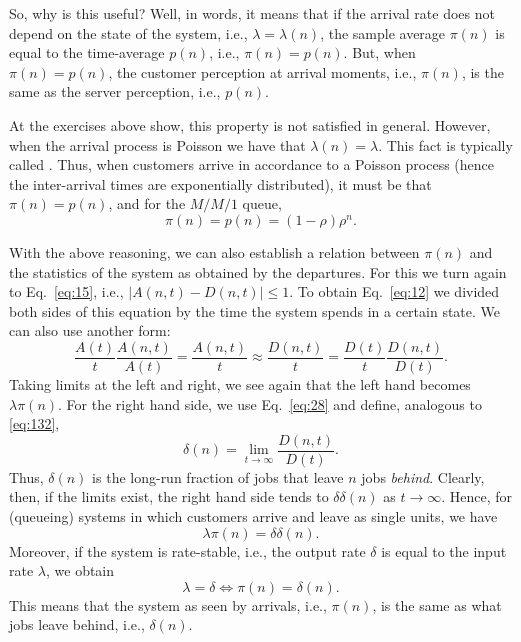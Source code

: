 So, why is this useful? Well, in words, it means that if the arrival
rate does not depend on the state of the system, i.e.,
$\lambda=\lambda(n)$, the sample average $\pi(n)$ is equal to the
time-average $p(n)$, i.e., $\pi(n)=p(n)$. But, when $\pi(n)=p(n)$, the
customer perception at arrival moments, i.e., $\pi(n)$, is the same as
the server perception, i.e., $p(n)$.

At the exercises above show, this property is not satisfied in
general.  However,  when the arrival process is
Poisson we have that $\lambda(n)=\lambda$. This fact is typically called . Thus, when customers arrive in
accordance to a Poisson process (hence the inter-arrival times are
exponentially distributed), it must be that $\pi(n) = p(n)$, and
for the $M/M/1$ queue,
\begin{equation*}
  \pi(n) = p(n) = (1-\rho)\rho^n.
\end{equation*}


With the above reasoning, we can also establish a relation between
$\pi(n)$ and the statistics of the system as obtained by the
departures. For this we
turn again to Eq.~\eqref{eq:15}, i.e., $|A(n,t) - D(n,t)| \leq 1$. To
obtain Eq.~\eqref{eq:12} we divided both sides of this equation by the
time the system spends in a certain state. We can also use another
form:
\begin{equation*}
\frac{A(t)}t \frac{A(n,t)}{A(t)} = \frac{A(n,t)}t \approx \frac{D(n,t)}t 
= \frac{D(t)}t \frac{D(n,t)}{D(t)}.
\end{equation*}
Taking limits at the left and right, we see again that the left hand
becomes $\lambda \pi(n)$. For the right hand side, we use
Eq.~\eqref{eq:28} and define, analogous to \eqref{eq:132}, 
\begin{equation}
  \label{eq:33}
  \delta(n) = \lim_{t\to\infty} \frac{D(n,t)}{D(t)}.
\end{equation}
Thus, $\delta(n)$ is the long-run fraction of jobs that leave $n$ jobs
\emph{behind}. Clearly, then, if the limits exist, the right hand side
tends to $\delta \delta(n)$ as $t\to\infty$. Hence, for (queueing)
systems in which customers arrive and leave as single units, we have
\begin{equation}
  \label{eq:36}
  \lambda \pi(n) = \delta \delta(n).
\end{equation}
Moreover, if the system is rate-stable, i.e., the output rate $\delta$ is equal to the input rate $\lambda$, we obtain
\begin{equation}
  \label{eq:39}
\lambda = \delta \iff  \pi(n) = \delta(n).
\end{equation}
This means that the system as seen by arrivals, i.e., $\pi(n)$, is
the same as what jobs leave behind, i.e., $\delta(n)$.


